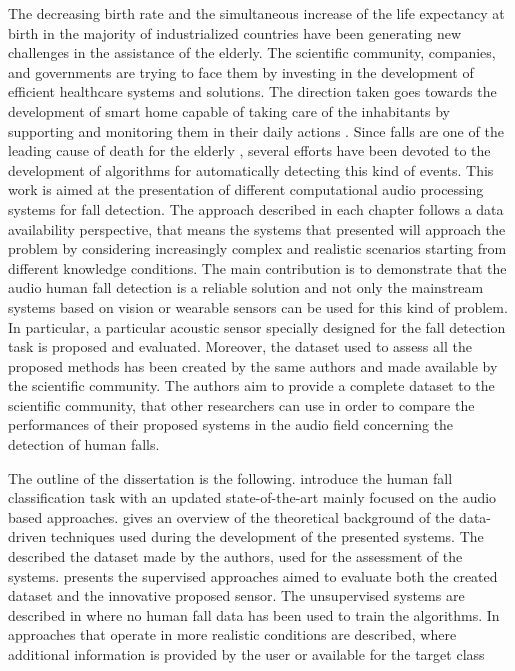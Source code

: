 The decreasing birth rate \cite{eurostat} and the simultaneous increase of the life expectancy at birth \cite{Carone2006} in the majority of industrialized countries have been generating new challenges in the assistance of the elderly. The scientific community, companies, and governments are trying to face them by investing in the development of efficient healthcare systems and solutions. The direction taken goes towards the development of smart home capable of taking care of the inhabitants by supporting and monitoring them in their daily actions \cite{Dawadi20161188, Principi2015a}. Since falls are one of the leading cause of death for the elderly \cite{mubashir2013survey}, several efforts have been devoted to the development of algorithms for automatically detecting this kind of events.
This work is aimed at the presentation of different computational audio processing systems for fall detection. The approach described in each chapter follows a data availability perspective, that means the systems that presented will approach the problem by considering increasingly complex and realistic scenarios starting from different knowledge conditions. The main contribution is to demonstrate that the audio human fall detection is a reliable solution and not only the mainstream systems based on vision or wearable sensors can be used for this kind of problem. In particular, a particular acoustic sensor specially designed for the fall detection task is proposed and evaluated. Moreover, the dataset used to assess all the proposed methods has been created by the same authors and made available by the scientific community. The authors aim to provide a complete dataset to the scientific community, that other researchers can use in order to compare the performances of their proposed systems in the audio field concerning the detection of human falls. 

The outline of the dissertation is the following.
introduce the human fall classification task with an updated state-of-the-art mainly focused on the audio based approaches.  gives an overview of the theoretical background of the data-driven techniques used during the development of the presented systems. The  described the dataset made by the authors, used for the assessment of the systems.  presents the supervised approaches aimed to evaluate both the created dataset and the innovative proposed sensor.
The unsupervised systems are described in  where no human fall data has been used to train the algorithms.
In  approaches that operate in more realistic conditions are described, where additional information is provided by the user or available for the target class





